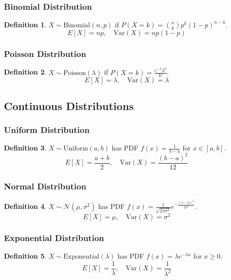 \documentclass[11pt]{article}
\theoremstyle{definition}
\newtheorem{definition}{Definition}[section]
\begin{document}
\subsubsection{Binomial Distribution}
\begin{definition}
$X \sim \text{Binomial}(n,p)$ if $P(X = k) = \binom{n}{k} p^k (1-p)^{n-k}$.
$$E[X] = np, \quad \text{Var}(X) = np(1-p)$$
\end{definition}

\subsubsection{Poisson Distribution}
\begin{definition}
$X \sim \text{Poisson}(\lambda)$ if $P(X = k) = \frac{e^{-\lambda} \lambda^k}{k!}$.
$$E[X] = \lambda, \quad \text{Var}(X) = \lambda$$
\end{definition}

\subsection{Continuous Distributions}

\subsubsection{Uniform Distribution}
\begin{definition}
$X \sim \text{Uniform}(a,b)$ has PDF $f(x) = \frac{1}{b-a}$ for $x \in [a,b]$.
$$E[X] = \frac{a+b}{2}, \quad \text{Var}(X) = \frac{(b-a)^2}{12}$$
\end{definition}

\subsubsection{Normal Distribution}
\begin{definition}
$X \sim \mathcal{N}(\mu, \sigma^2)$ has PDF $f(x) = \frac{1}{\sqrt{2\pi\sigma^2}} e^{-\frac{(x-\mu)^2}{2\sigma^2}}$.
$$E[X] = \mu, \quad \text{Var}(X) = \sigma^2$$
\end{definition}

\subsubsection{Exponential Distribution}
\begin{definition}
$X \sim \text{Exponential}(\lambda)$ has PDF $f(x) = \lambda e^{-\lambda x}$ for $x \geq 0$.
$$E[X] = \frac{1}{\lambda}, \quad \text{Var}(X) = \frac{1}{\lambda^2}$$
\end{definition}
\end{document}
